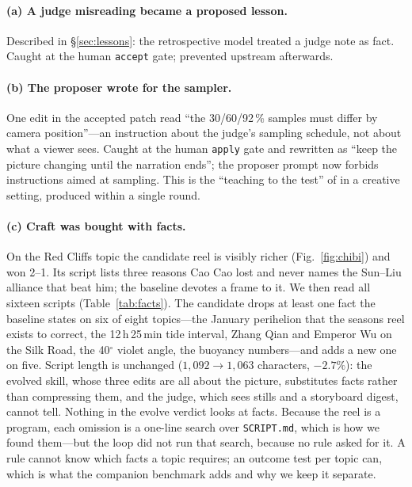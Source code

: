 \documentclass[11pt]{article}
\begin{document}
\paragraph{(a) A judge misreading became a proposed lesson.} Described in \S\ref{sec:lessons}: the
retrospective model treated a judge note as fact. Caught at the human \texttt{accept} gate; prevented
upstream afterwards.

\paragraph{(b) The proposer wrote for the sampler.} One edit in the accepted patch read ``the
30/60/92\,\% samples must differ by camera position''---an instruction about the judge's sampling
schedule, not about what a viewer sees. Caught at the human \texttt{apply} gate and rewritten as
``keep the picture changing until the narration ends''; the proposer prompt now forbids instructions
aimed at sampling. This is the ``teaching to the test'' of \citet{notanoracle2026} in a creative
setting, produced within a single round.

\paragraph{(c) Craft was bought with facts.} On the Red Cliffs topic the candidate reel is visibly
richer (Fig.~\ref{fig:chibi}) and won 2--1. Its script lists three reasons Cao Cao lost and never
names the Sun--Liu alliance that beat him; the baseline devotes a frame to it. We then read all
sixteen scripts (Table~\ref{tab:facts}). The candidate drops at least one fact the baseline states on
six of eight topics---the January perihelion that the seasons reel exists to correct, the 12\,h\,25\,min
tide interval, Zhang Qian and Emperor Wu on the Silk Road, the 40$^\circ$ violet angle, the buoyancy
numbers---and adds a new one on five. Script length is unchanged ($1{,}092 \rightarrow 1{,}063$
characters, $-2.7\%$): the evolved skill, whose three edits are all about the picture, substitutes
facts rather than compressing them, and the judge, which sees stills and a storyboard digest, cannot
tell. Nothing in the evolve verdict looks at facts. Because the reel is a program, each omission is a
one-line search over \texttt{SCRIPT.md}, which is how we found them---but the loop did not run that
search, because no rule asked for it. A rule cannot know which facts a topic requires; an outcome test
per topic can, which is what the companion benchmark adds and why we keep it separate.
\end{document}
